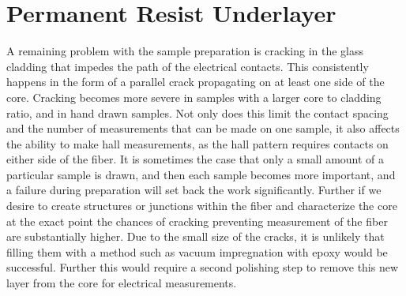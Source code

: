 \section{Permanent Resist Underlayer}
A remaining problem with the sample preparation is cracking in the glass cladding that impedes the path of the electrical contacts. This consistently happens in the form of a parallel crack propagating on at least one side of the core. Cracking becomes more severe in samples with a larger core to cladding ratio, and in hand drawn samples. Not only does this limit the contact spacing and the number of measurements that can be made on one sample, it also affects the ability to make hall measurements, as the hall pattern requires contacts on either side of the fiber. It is sometimes the case that only a small amount of a particular sample is drawn, and then each sample becomes more important, and a failure during preparation will set back the work significantly. Further if we desire to create structures or junctions within the fiber and characterize the core at the exact point the chances of cracking preventing measurement of the fiber are substantially higher. Due to the small size of the cracks, it is unlikely that filling them with a method such as vacuum impregnation with epoxy would be successful. Further this would require a second polishing step to remove this new layer from the core for electrical measurements.

 
 
